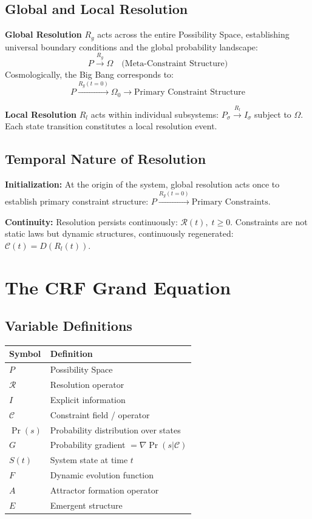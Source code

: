 \documentclass[12pt, a4paper]{article}
\begin{document}
\subsection{Global and Local Resolution}

\textbf{Global Resolution} $R_g$ acts across the entire Possibility Space,
establishing universal boundary conditions and the global probability landscape:
\[
  P \xrightarrow{R_g} \Omega \quad \text{(Meta-Constraint Structure)}
\]
Cosmologically, the Big Bang corresponds to:
\[
  P \xrightarrow{R_g(t=0)} \Omega_0 \to \text{Primary Constraint Structure}
\]

\textbf{Local Resolution} $R_l$ acts within individual subsystems:
$P_\sigma \xrightarrow{R_l} I_\sigma$ subject to $\Omega$.
Each state transition constitutes a local resolution event.

\subsection{Temporal Nature of Resolution}

\textbf{Initialization:} At the origin of the system, global resolution acts once to
establish primary constraint structure: $P \xrightarrow{R_g(t=0)} \text{Primary Constraints}$.

\textbf{Continuity:} Resolution persists continuously: $\mathcal{R}(t),\; t \geq 0$.
Constraints are not static laws but dynamic structures, continuously regenerated:
$\mathcal{C}(t) = D(R_l(t))$.

\section{The CRF Grand Equation}

\subsection{Variable Definitions}

\begin{center}
\renewcommand{\arraystretch}{1.2}
\begin{tabular}{ll}
\toprule
\textbf{Symbol} & \textbf{Definition} \\
\midrule
$P$ & Possibility Space \\
$\mathcal{R}$ & Resolution operator \\
$I$ & Explicit information \\
$\mathcal{C}$ & Constraint field / operator \\
$\Pr(s)$ & Probability distribution over states \\
$G$ & Probability gradient $= \nabla\Pr(s|\mathcal{C})$ \\
$S(t)$ & System state at time $t$ \\
$F$ & Dynamic evolution function \\
$A$ & Attractor formation operator \\
$E$ & Emergent structure \\
\bottomrule
\end{tabular}
\end{center}
\end{document}
